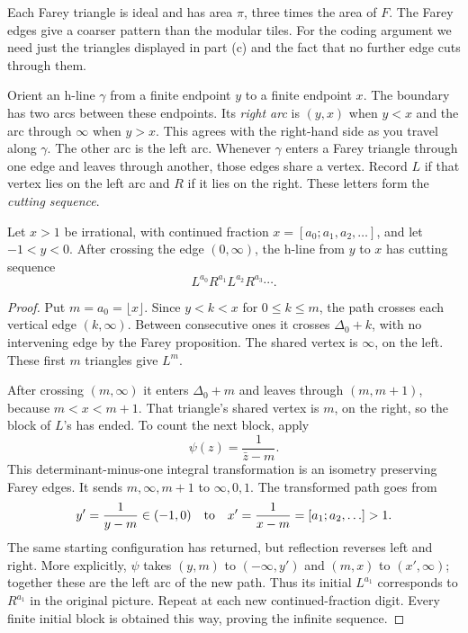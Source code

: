 Each Farey triangle is ideal and has area $\pi$, three times the area of $F$. The Farey edges give a coarser pattern than the modular tiles. For the coding argument we need just the triangles displayed in part (c) and the fact that no further edge cuts through them.

Orient an h-line $\gamma$ from a finite endpoint $y$ to a finite endpoint $x$. The boundary has two arcs between these endpoints. Its \emph{right arc} is $(y,x)$ when $y<x$ and the arc through $\infty$ when $y>x$. This agrees with the right-hand side as you travel along $\gamma$. The other arc is the left arc. Whenever $\gamma$ enters a Farey triangle through one edge and leaves through another, those edges share a vertex. Record $L$ if that vertex lies on the left arc and $R$ if it lies on the right. These letters form the \emph{cutting sequence}.

\begin{theorem}[Series, 1985]\label{thm:cutting}
Let $x>1$ be irrational, with continued fraction $x=[a_0;a_1,a_2,\ldots]$, and let $-1<y<0$. After crossing the edge $(0,\infty)$, the h-line from $y$ to $x$ has cutting sequence
\[
L^{a_0}R^{a_1}L^{a_2}R^{a_3}\cdots.
\]
\end{theorem}

\begin{proof}
Put $m=a_0=\lfloor x\rfloor$. Since $y<k<x$ for $0\le k\le m$, the path crosses each vertical edge $(k,\infty)$. Between consecutive ones it crosses $\Delta_0+k$, with no intervening edge by the Farey proposition. The shared vertex is $\infty$, on the left. These first $m$ triangles give $L^m$.

After crossing $(m,\infty)$ it enters $\Delta_0+m$ and leaves through $(m,m+1)$, because $m<x<m+1$. That triangle's shared vertex is $m$, on the right, so the block of $L$'s has ended. To count the next block, apply
\[
\psi(z)=\frac1{\bar z-m}.
\]
This determinant-minus-one integral transformation is an isometry preserving Farey edges. It sends $m,\infty,m+1$ to $\infty,0,1$. The transformed path goes from
\[
y'=\frac1{y-m}\in(-1,0)\quad\hbox{to}\quad
x'=\frac1{x-m}=[a_1;a_2,\ldots]>1.
\]
The same starting configuration has returned, but reflection reverses left and right. More explicitly, $\psi$ takes $(y,m)$ to $(-\infty,y')$ and $(m,x)$ to $(x',\infty)$; together these are the left arc of the new path. Thus its initial $L^{a_1}$ corresponds to $R^{a_1}$ in the original picture. Repeat at each new continued-fraction digit. Every finite initial block is obtained this way, proving the infinite sequence.
\end{proof}


